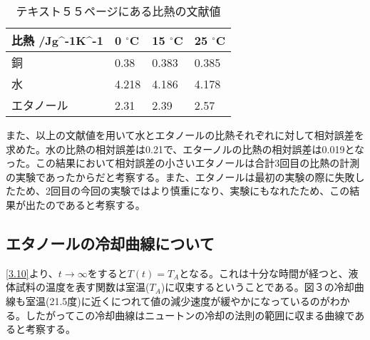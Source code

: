 \documentclass{jsarticle}
\begin{document}
\begin{table}[H]
	\centering
	\caption{テキスト５５ページにある比熱の文献値}
	\label{my-label}
	\begin{tabular}{llll}
	\hline
	比熱 /Jg\textasciicircum -1K\textasciicircum -1 & 0 $^\circ$C    & 15  $^\circ$C  & 25  $^\circ$C  \\ \hline
	銅                                             & 0.38  & 0.383 & 0.385 \\
	水                                             & 4.218 & 4.186 & 4.178 \\
	エタノール                                         & 2.31  & 2.39  & 2.57 
	\end{tabular}
\end{table}

また、以上の文献値を用いて水とエタノールの比熱それぞれに対して相対誤差を求めた。水の比熱の相対誤差は0.21で、エターノルの比熱の相対誤差は0.019となった。この結果において相対誤差の小さいエタノールは合計3回目の比熱の計測の実験であったからだと考察する。また、エタノールは最初の実験の際に失敗したため、2回目の今回の実験ではより慎重になり、実験にもなれたため、この結果が出たのであると考察する。

\subsection{エタノールの冷却曲線について}
\ref{3.10}より、$t\to \infty$をすると$T(t) = T_A$となる。これは十分な時間が経つと、液体試料の温度を表す関数は室温($T_A$)に収束するということである。図３の冷却曲線も室温(21.5度)に近くにつれて値の減少速度が緩やかになっているのがわかる。したがってこの冷却曲線はニュートンの冷却の法則の範囲に収まる曲線であると考察する。
\end{document}
